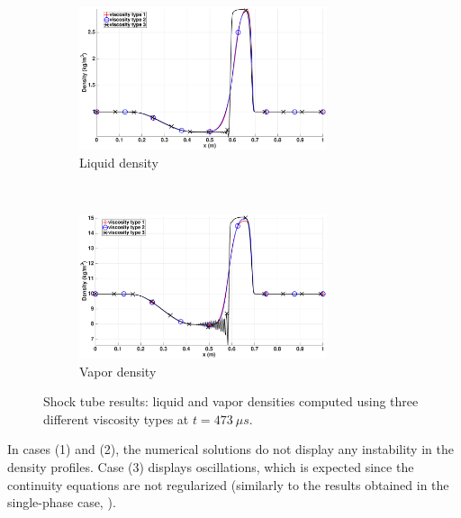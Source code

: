 \begin{figure}[!htbp]
        \centering
        \begin{subfigure}[b]{0.95\textwidth}
                \centering
                \includegraphics[width=0.8\textwidth]{figures/relaxation_vapor_density_multiple_visc.eps}
                \caption{Liquid density}
                \label{fig:liq-density}
        \end{subfigure}
				\\
        \begin{subfigure}[b]{0.95\textwidth}
                \centering
                \includegraphics[width=0.8\textwidth]{figures/relaxation_liquid_density_multiple_visc.eps}
                \caption{Vapor density}
                \label{fig:vap-density}
        \end{subfigure}
        \caption{Shock tube results: liquid and vapor densities computed using three different viscosity types at $t=473 \ \mu s$.}\label{fig:density}
\end{figure}
%
In cases (1) and (2), the numerical solutions do not display any instability in the density profiles. Case (3) displays oscillations, which is expected since the continuity equations are not regularized (similarly to the results obtained in the single-phase case, \cite{jlg_VR_SIAM_2004}).
%
